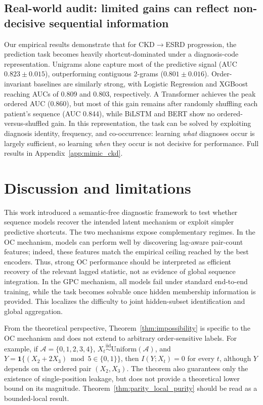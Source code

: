 \documentclass[fullpaper]{nldl}
\theoremstyle{plain}
\theoremstyle{definition}
\theoremstyle{remark}
\begin{document}
\subsection{Real-world audit: limited gains can reflect non-decisive sequential information}
\label{sec:mimic_ckd_results}
Our empirical results demonstrate that for CKD$\to$ESRD progression, the prediction task becomes heavily shortcut-dominated under a diagnosis-code representation. Unigrams alone capture most of the predictive signal (AUC $0.823 \pm 0.015$), outperforming contiguous 2-grams ($0.801 \pm 0.016$). Order-invariant baselines are similarly strong, with Logistic Regression and XGBoost reaching AUCs of 0.809 and 0.803, respectively. A Transformer achieves the peak ordered AUC (0.860), but most of this gain remains after randomly shuffling each patient's sequence (AUC 0.844), while BiLSTM and BERT show no ordered-versus-shuffled gain. In this representation, the task can be solved by exploiting diagnosis identity, frequency, and co-occurrence: learning \emph{what} diagnoses occur is largely sufficient, so learning \emph{when} they occur is not decisive for performance. Full results in Appendix~\ref{app:mimic_ckd}.

\section{Discussion and limitations}
\label{sec:limitations}
This work introduced a semantic-free diagnostic framework to test whether sequence models recover the intended latent mechanism or exploit simpler predictive shortcuts. The two mechanisms expose complementary regimes. In the OC mechanism, models can perform well by discovering lag-aware pair-count features; indeed, these features match the empirical ceiling reached by the best encoders. Thus, strong OC performance should be interpreted as efficient recovery of the relevant lagged statistic, not as evidence of global sequence integration. In the GPC mechanism, all models fail under standard end-to-end training, while the task becomes solvable once hidden membership information is provided. This localizes the difficulty to joint hidden-subset identification and global aggregation.

From the theoretical perspective, Theorem~\ref{thm:impossibility} is specific to the OC mechanism and does not extend to arbitrary order-sensitive labels. For example, if $\mathcal{A}=\{0,1,2,3,4\}$, $X_t \overset{\mathrm{iid}}{\sim} \mathrm{Uniform}(\mathcal{A})$, and $Y=\mathbf{1}\{(X_2+2X_3)\bmod 5 \in \{0,1\}\}$, then $I(Y;X_t)=0$ for every $t$, although $Y$ depends on the ordered pair $(X_2,X_3)$. The theorem also guarantees only the existence of single-position leakage, but does not provide a theoretical lower bound on its magnitude. Theorem~\ref{thm:parity_local_purity} should be read as a bounded-local result.
\end{document}
